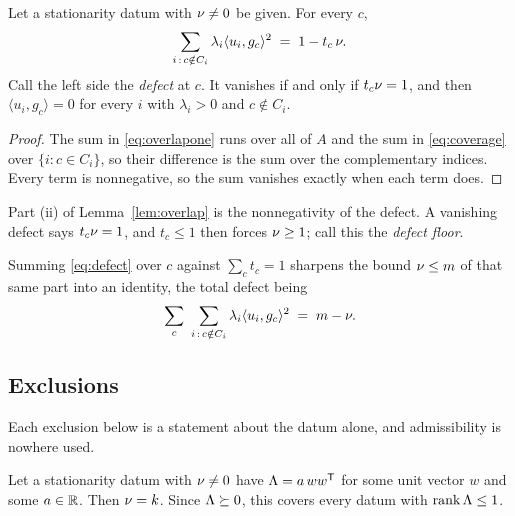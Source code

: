 \begin{lemma}[Lean]\label{lem:defect}
Let a stationarity datum with $\nu\ne0$ be given.  For every $c$,
\begin{equation}\label{eq:defect}
  \sum_{i\,:\,c\notin C_i}\lambda_i\langle u_i,g_c\rangle^2
  \;=\;1-t_c\,\nu .
\end{equation}
Call the left side the \emph{defect} at $c$.  It vanishes if and only if
$t_c\nu=1$, and then $\langle u_i,g_c\rangle=0$ for every $i$ with
$\lambda_i>0$ and $c\notin C_i$.
\end{lemma}

\begin{proof}
The sum in \eqref{eq:overlapone} runs over all of $A$ and the sum in
\eqref{eq:coverage} over $\{i:c\in C_i\}$, so their difference is the sum
over the complementary indices.  Every term is nonnegative, so the sum
vanishes exactly when each term does.
\end{proof}

Part (ii) of Lemma~\ref{lem:overlap} is the nonnegativity of the defect.
A vanishing defect says $t_c\nu=1$, and $t_c\le1$ then forces $\nu\ge1$;
call this the \emph{defect floor}.

Summing \eqref{eq:defect} over $c$ against $\sum_ct_c=1$ sharpens the
bound $\nu\le m$ of that same part into an identity, the total defect
being
\[
  \sum_c\ \sum_{i\,:\,c\notin C_i}\lambda_i\langle u_i,g_c\rangle^2
  \;=\;m-\nu .
\]

\subsection{Exclusions}\label{sec:exclusions}

Each exclusion below is a statement about the datum alone, and
admissibility is nowhere used.

\begin{proposition}[Lean]\label{prop:e1}
Let a stationarity datum with $\nu\ne0$ have $\Lambda=a\,ww^{\mathsf{T}}$ for
some unit vector $w$ and some $a\in\mathbb{R}$.  Then $\nu=k$.  Since
$\Lambda\succeq0$, this covers every datum with $\operatorname{rank}\Lambda\le1$.
\end{proposition}

